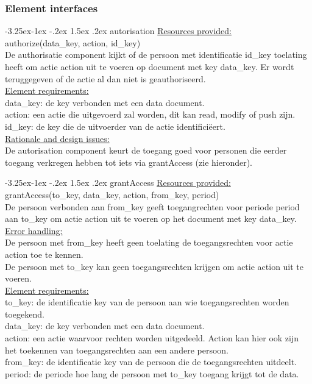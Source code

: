 \documentclass[a4paper,10pt]{article}
\makeatletter
\renewcommand\paragraph{\@startsection{paragraph}{4}{\z@}%
  {-3.25ex\@plus -1ex \@minus -.2ex}%
  {1.5ex \@plus .2ex}%
  {\normalfont\normalsize\bfseries}}
\makeatother
\begin{document}
\subsubsection*{Element interfaces} 

\paragraph{autorisation}
\underline{Resources provided:}\\
authorize(data\_key, action, id\_key)\\
De authorisatie component kijkt of de persoon met identificatie id\_key toelating heeft om actie action uit te voeren op document met key data\_key.  Er wordt teruggegeven of de actie al dan niet is geauthoriseerd.\\

\underline{Element requirements:}\\
data\_key: de key verbonden met een data document.\\
action: een actie die uitgevoerd zal worden, dit kan read, modify of push zijn.\\
id\_key: de key die de uitvoerder van de actie identifici\"{e}ert.\\

\underline{Rationale and design issues:}\\
De autorisation component keurt de toegang goed voor personen die eerder toegang verkregen hebben tot iets via grantAccess (zie hieronder).

\paragraph{grantAccess}
\underline{Resources provided:}\\
grantAccess(to\_key, data\_key, action, from\_key, period)\\
De persoon verbonden aan from\_key geeft toegangrechten voor periode period aan to\_key om actie action uit te voeren op het document met key data\_key.\\

\underline{Error handling:}\\
De persoon met from\_key heeft geen toelating de toegangsrechten voor actie action toe te kennen.\\
De persoon met to\_key kan geen toegangsrechten krijgen om actie action uit te voeren.\\

\underline{Element requirements:}\\
to\_key: de identificatie key van de persoon aan wie toegangsrechten worden toegekend.\\
data\_key: de key verbonden met een data document.\\
action: een actie waarvoor rechten worden uitgedeeld.  Action kan hier ook zijn het toekennen van toegangsrechten aan een andere persoon.\\
from\_key: de identificatie key van de persoon die de toegangsrechten uitdeelt.\\
period: de periode hoe lang de persoon met to\_key toegang krijgt tot de data.\\
\end{document}
